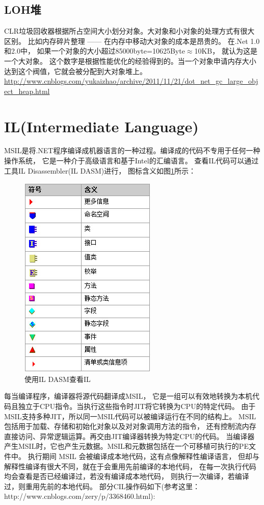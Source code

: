 \documentclass{book}
\begin{document}
\subsection{LOH堆}

CLR垃圾回收器根据所占空间大小划分对象。大对象和小对象的处理方式有很大区别。
比如内存碎片整理 ------ 在内存中移动大对象的成本是昂贵的。
在.Net 1.0和2.0中，
如果一个对象的大小超过85000byte=10625Byte$\approx$10KB，
就认为这是一个大对象。
这个数字是根据性能优化的经验得到的。当一个对象申请内存大小达到这个阀值，它就会被分配到大对象堆上。
\url{http://www.cnblogs.com/yukaizhao/archive/2011/11/21/dot_net_gc_large_object_heap.html}

\section{IL(Intermediate Language)}

MSIL是将.NET程序编译成机器语言的一种过程。编译成的代码不专用于任何一种操作系统，
它是一种介于高级语言和基于Intel的汇编语言。
查看IL代码可以通过工具IL Disassembler(IL DASM)进行，
图标含义如图\ref{fig:ILDasmblerIcon}所示：

\begin{figure}[htbp]
	\centering
	\includegraphics[scale=0.5]{ILDasmblerIcon.png}
	\caption{使用IL DASM查看IL}
	\label{fig:ILDasmblerIcon}
\end{figure}

每当编译程序，编译器将源代码翻译成MSIL，
它是一组可以有效地转换为本机代码且独立于CPU指令。当执行这些指令时JIT将它转换为CPU的特定代码。
由于MSIL支持多种JIT，所以同一MSIL代码可以被编译运行在不同的结构上。
MSIL包括用于加载、存储和初始化对象以及对对象调用方法的指令，
还有控制流内存直接访问、异常逻辑运算。再交由JIT编译器转换为特定CPU的代码。
当编译器产生MSIL时，它也产生元数据。MSIL和元数据包括在一个可移植可执行的PE文件中。
执行期间 MSIL 会被编译成本地代码，这有点像解释性编译语言，
但却与解释性编译有很大不同，就在于会重用先前编译的本地代码，
在每一次执行代码均会查看是否已经编译过，若没有编译成本地代码，
则执行一次编译，若编译过，则重用先前的本地代码。
部分CIL操作码如下(参考这里：http://www.cnblogs.com/zery/p/3368460.html):
\end{document}
